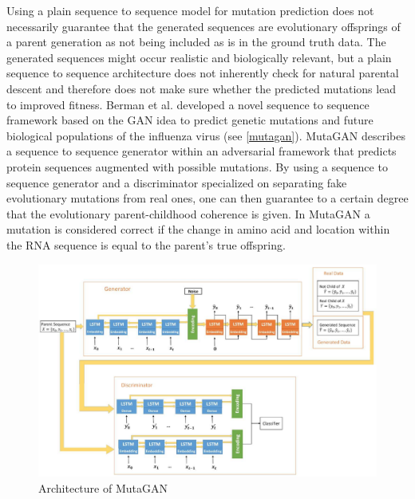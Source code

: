 Using a plain sequence to sequence model for mutation prediction does not necessarily guarantee that the generated sequences are evolutionary offsprings of a parent generation as not being included as is in the ground truth data. The generated sequences might occur realistic and biologically relevant, but a plain sequence to sequence architecture does not inherently check for natural parental descent and therefore does not make sure whether the predicted mutations lead to improved fitness. Berman et al. \cite{Berman2020} developed a novel sequence to sequence framework based on the \ac{GAN} idea to predict genetic mutations and future biological populations of the influenza virus (see \autoref{mutagan}). Muta\-GAN describes a sequence to sequence generator within an adversarial framework that predicts protein sequences augmented with possible mutations. By using a sequence to sequence generator and a discriminator specialized on separating fake evolutionary mutations from real ones, one can then guarantee to a certain degree that the evolutionary parent-childhood coherence is given. In MutaGAN a mutation is considered correct if the change in amino acid and location within the \ac{RNA} sequence is equal to the parent's true offspring.  \cite{Berman2020}

\begin{figure}[ht]
	\centering
	\includegraphics[width=\linewidth]{figures/mutagan.png}
	\caption{Architecture of MutaGAN \cite{Berman2020}}
	\label{mutagan}
\end{figure}

